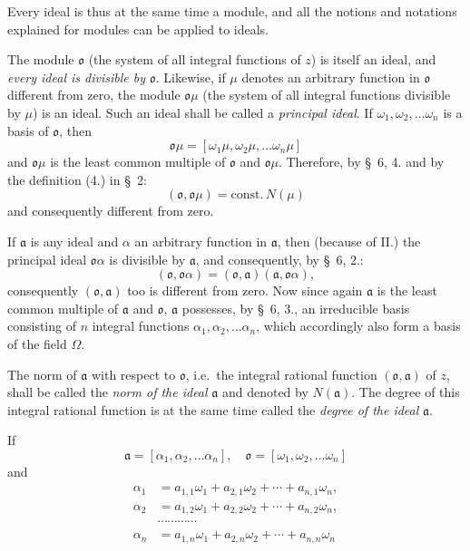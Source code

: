 \documentclass{article}
\begin{document}
Every ideal is thus at the same time a module, and all the notions and notations explained for modules can be applied to ideals.

The module $\mathfrak{o}$ (the system of all integral functions of $z$) is itself an ideal, and \emph{every ideal is divisible by $\mathfrak{o}$}. Likewise, if $\mu$ denotes an arbitrary function in $\mathfrak{o}$ different from zero, the module $\mathfrak{o}\mu$ (the system of all integral functions divisible by $\mu$) is an ideal. Such an ideal shall be called a \emph{principal ideal}. If $\omega_{1}, \omega_{2}, \ldots \omega_{n}$ is a basis of $\mathfrak{o}$, then
\[ \mathfrak{o}\mu = [\omega_{1}\mu, \omega_{2}\mu, \ldots \omega_{n}\mu] \]
and $\mathfrak{o}\mu$ is the least common multiple of $\mathfrak{o}$ and $\mathfrak{o}\mu$. Therefore, by §~6, 4. and by the definition (4.) in §~2:
\[ (\mathfrak{o}, \mathfrak{o}\mu) = \text{const.}\,N(\mu) \tag{1.} \]
and consequently different from zero.

If $\mathfrak{a}$ is any ideal and $\alpha$ an arbitrary function in $\mathfrak{a}$, then (because of II.) the principal ideal $\mathfrak{o}\alpha$ is divisible by $\mathfrak{a}$, and consequently, by §~6, 2.:
\[ (\mathfrak{o}, \mathfrak{o}\alpha) = (\mathfrak{o}, \mathfrak{a})(\mathfrak{a}, \mathfrak{o}\alpha), \tag{2.} \]
consequently $(\mathfrak{o}, \mathfrak{a})$ too is different from zero. Now since again $\mathfrak{a}$ is the least common multiple of $\mathfrak{a}$ and $\mathfrak{o}$, $\mathfrak{a}$ possesses, by §~6, 3., an irreducible basis consisting of $n$ integral functions $\alpha_{1}, \alpha_{2}, \ldots \alpha_{n}$, which accordingly also form a basis of the field $\Omega$.

The norm of $\mathfrak{a}$ with respect to $\mathfrak{o}$, i.e.\ the integral rational function $(\mathfrak{o}, \mathfrak{a})$ of $z$, shall be called the \emph{norm of the ideal} $\mathfrak{a}$ and denoted by $N(\mathfrak{a})$. The degree of this integral rational function is at the same time called the \emph{degree of the ideal} $\mathfrak{a}$.

If
\[ \mathfrak{a} = [\alpha_{1}, \alpha_{2}, \ldots \alpha_{n}], \quad \mathfrak{o} = [\omega_{1}, \omega_{2}, \ldots \omega_{n}] \]
and
\[ \begin{aligned} \alpha_{1} &= a_{1,1}\omega_{1} + a_{2,1}\omega_{2} + \cdots + a_{n,1}\omega_{n}, \\ \alpha_{2} &= a_{1,2}\omega_{1} + a_{2,2}\omega_{2} + \cdots + a_{n,2}\omega_{n}, \\ &\cdots\cdots\cdots\cdots \\ \alpha_{n} &= a_{1,n}\omega_{1} + a_{2,n}\omega_{2} + \cdots + a_{n,n}\omega_{n} \end{aligned} \]
\end{document}
